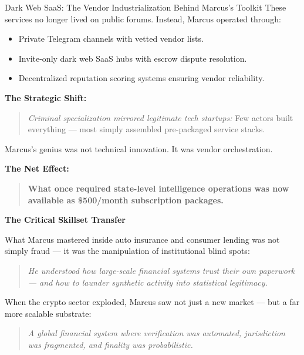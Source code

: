 \begin{HistoricalSidebar}{Dark Web SaaS: The Vendor Industrialization Behind Marcus's Toolkit}
    These services no longer lived on public forums. Instead, Marcus operated through:
    
    \begin{itemize}
        \item Private Telegram channels with vetted vendor lists.
        \item Invite-only dark web SaaS hubs with escrow dispute resolution.
        \item Decentralized reputation scoring systems ensuring vendor reliability.
    \end{itemize}
    
    \medskip
    
    \textbf{The Strategic Shift:}
    
    \begin{quote}
    \emph{Criminal specialization mirrored legitimate tech startups:}  
    Few actors built everything — most simply assembled pre-packaged service stacks.
    \end{quote}
    
    Marcus’s genius was not technical innovation.  
    It was vendor orchestration.
    
    \medskip
    
    \textbf{The Net Effect:}
    
    \begin{quote}
    \textbf{What once required state-level intelligence operations  
    was now available as \$500/month subscription packages.}
    \end{quote}
    
\end{HistoricalSidebar}


\medskip

\textbf{The Critical Skillset Transfer}

What Marcus mastered inside auto insurance and consumer lending was not simply fraud — it was the manipulation of institutional blind spots:

\begin{quote}
\emph{He understood how large-scale financial systems trust their own paperwork — and how to launder synthetic activity into statistical legitimacy.}
\end{quote}

When the crypto sector exploded, Marcus saw not just a new market — but a far more scalable substrate:

\begin{quote}
\emph{A global financial system where verification was automated, jurisdiction was fragmented, and finality was probabilistic.}
\end{quote}

